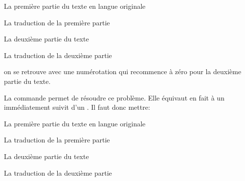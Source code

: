 \begin{latexcode}
\begin{pages}  
    \begin{Leftside}  \beginnumbering 
La première partie du texte en langue originale
    \endnumbering  \end{Leftside} 
 
    \begin{Rightside} \beginnumbering
La traduction de la première partie
    \endnumbering \end{Rightside} 
 \Pages
 
    \begin{Leftside} \beginnumbering  
La deuxième partie du texte 
    \endnumbering  \end{Leftside} 
 
    \begin{Rightside}  \beginnumbering
La traduction de la deuxième partie
    \endnumbering \end{Rightside} 
 \Pages

  \end{pages}
\end{latexcode}

on se retrouve avec une numérotation qui recommence à zéro pour la deuxième partie du texte. 

La commande  permet de résoudre ce problème. Elle équivaut en fait à un  immédiatement suivit d'un . Il faut donc mettre: 

\begin{latexcode}
\begin{pages}  
    \begin{Leftside}  \beginnumbering 
La première partie du texte en langue originale
 \end{Leftside} %
 
\begin{Rightside} \beginnumbering
La traduction de la première partie
 \end{Rightside} %
 \Pages
 
    \begin{Leftside} \memorydump %
La deuxième partie du texte 
    \endnumbering  \end{Leftside}
    
    \begin{Rightside}  \memorydump %
La traduction de la deuxième partie
    \endnumbering \end{Rightside}   %
 
 \Pages

  \end{pages}
\end{latexcode}

